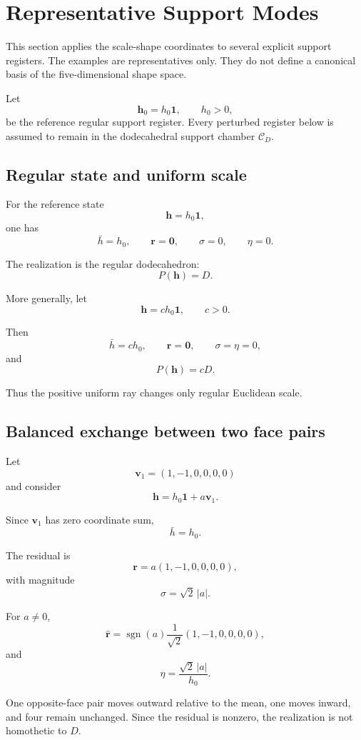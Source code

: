 \section{Representative Support Modes}

This section applies the scale-shape coordinates to several explicit support
registers. The examples are representatives only. They do not define a
canonical basis of the five-dimensional shape space.

Let
\[
\mathbf h_0=h_0\mathbf 1,
\qquad
h_0>0,
\]
be the reference regular support register. Every perturbed register below is
assumed to remain in the dodecahedral support chamber \(\mathcal C_D\).

\subsection{Regular state and uniform scale}

For the reference state
\[
\mathbf h=h_0\mathbf 1,
\]
one has
\[
\bar h=h_0,
\qquad
\mathbf r=\mathbf 0,
\qquad
\sigma=0,
\qquad
\eta=0.
\]

The realization is the regular dodecahedron:
\[
P(\mathbf h)=D.
\]

More generally, let
\[
\mathbf h=ch_0\mathbf 1,
\qquad
c>0.
\]

Then
\[
\bar h=ch_0,
\qquad
\mathbf r=\mathbf 0,
\qquad
\sigma=\eta=0,
\]
and
\[
P(\mathbf h)=cD.
\]

Thus the positive uniform ray changes only regular Euclidean scale.

\subsection{Balanced exchange between two face pairs}

Let
\[
\mathbf v_1=(1,-1,0,0,0,0)
\]
and consider
\[
\mathbf h
=
h_0\mathbf 1+a\mathbf v_1.
\]

Since \(\mathbf v_1\) has zero coordinate sum,
\[
\bar h=h_0.
\]

The residual is
\[
\mathbf r
=
a(1,-1,0,0,0,0),
\]
with magnitude
\[
\sigma
=
\sqrt{2}\,|a|.
\]

For \(a\ne0\),
\[
\widehat{\mathbf r}
=
\operatorname{sgn}(a)
\frac{1}{\sqrt{2}}
(1,-1,0,0,0,0),
\]
and
\[
\eta
=
\frac{\sqrt{2}\,|a|}{h_0}.
\]

One opposite-face pair moves outward relative to the mean, one moves inward,
and four remain unchanged. Since the residual is nonzero, the realization is
not homothetic to \(D\).

